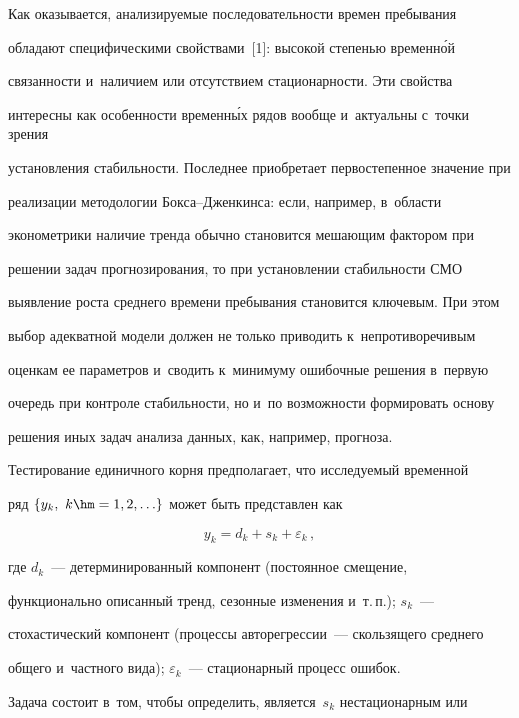      


     Как оказывается, анализируемые последовательности времен пребывания 


обладают специфическими свойствами~[1]: высокой сте\-пенью временн\'{о}й 


свя\-зан\-ности и~наличием или отсутствием ста\-ци\-о\-нар\-ности. Эти свойства 


интересны как особенности временн\'{ы}х рядов вообще и~актуальны с~точки зрения 


установления ста\-биль\-ности. Последнее приобретает первостепенное значение при 


реализации методологии Бок\-са--Джен\-кин\-са: если, например, в~об\-ласти 


эко\-но\-мет\-ри\-ки наличие тренда обычно становится ме\-ша\-ющим фактором при 


решении задач прогнозирования, то при установлении ста\-биль\-ности СМО 


выявление роста сред\-не\-го времени пребывания становится ключевым. При этом 


выбор адекватной модели должен не только приводить к~непротиворечивым 


оценкам ее па\-ра\-мет\-ров и~сводить к~минимуму ошибочные решения в~первую 


очередь при контроле ста\-биль\-ности, но и~по воз\-мож\-ности формировать основу 


решения иных задач анализа данных, как, например, прогноза. 


     


     Тестирование единичного корня предполагает, что ис\-сле\-ду\-емый временной 


ряд $\{y_k,\ k\hm=1,2,\ldots\}$ может быть пред\-став\-лен как


     $$


     y_k=d_k+s_k+\varepsilon_k\,,


     $$


где $d_k$~--- детерминированный компонент (постоянное смещение, 


функционально описанный тренд, сезонные изменения и~т.\,п.); $s_k$~--- 


стохастический компонент (процессы авторегрессии~--- скользящего среднего 


общего и~част\-но\-го вида); $\varepsilon_k$~--- стационарный процесс ошибок. 


Задача состоит в~том, чтобы определить, является~$s_k$ нестационарным или 


